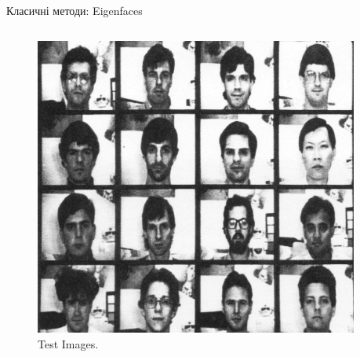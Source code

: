 \documentclass{zkdl-presentation-template}
\begin{document}
    \begin{frame}{Класичні методи: Eigenfaces}

        \begin{columns}
            \begin{column}{0.5\textwidth}
                \begin{figure}
                \centering
                    \includegraphics[width=0.95\textwidth]{images/test_faces.png}
                    \caption{Test Images.}
                \end{figure}
            \end{column}


\end{columns}
\end{frame}
\end{document}
